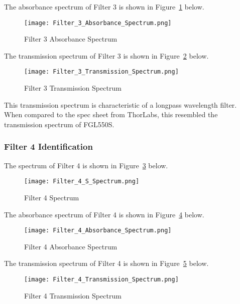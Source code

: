 \documentclass{article}
\begin{document}
The absorbance spectrum of Filter 3 is shown in Figure~\ref{fig:filter 3 A spectrum} below.

\begin{figure} [h!]
    \centering
    \texttt{[image: Filter\_3\_Absorbance\_Spectrum.png]}
    \caption{Filter 3 Absorbance Spectrum}
    \label{fig:filter 3 A spectrum}
\end{figure}

The transmission spectrum of Filter 3 is shown in Figure~\ref{fig:filter 3 T spectrum} below.

\begin{figure} [h!]
    \centering
    \texttt{[image: Filter\_3\_Transmission\_Spectrum.png]}
    \caption{Filter 3 Transmission Spectrum}
    \label{fig:filter 3 T spectrum}
\end{figure}

This transmission spectrum is characteristic of a longpass wavelength filter. When compared to the spec sheet from ThorLabs, this resembled the transmission spectrum of FGL550S.

\subsubsection{Filter 4 Identification}

The spectrum of Filter 4 is shown in Figure~\ref{fig:filter 4 S spectrum} below.

\begin{figure} [h!]
    \centering
    \texttt{[image: Filter\_4\_S\_Spectrum.png]}
    \caption{Filter 4 Spectrum}
    \label{fig:filter 4 S spectrum}
\end{figure}

The absorbance spectrum of Filter 4 is shown in Figure~\ref{fig:filter 4 A spectrum} below.

\begin{figure} [h!]
    \centering
    \texttt{[image: Filter\_4\_Absorbance\_Spectrum.png]}
    \caption{Filter 4 Absorbance Spectrum}
    \label{fig:filter 4 A spectrum}
\end{figure}

The transmission spectrum of Filter 4 is shown in Figure~\ref{fig:filter 4 T spectrum} below.

\begin{figure} [h!]
    \centering
    \texttt{[image: Filter\_4\_Transmission\_Spectrum.png]}
    \caption{Filter 4 Transmission Spectrum}
    \label{fig:filter 4 T spectrum}
\end{figure}
\end{document}
